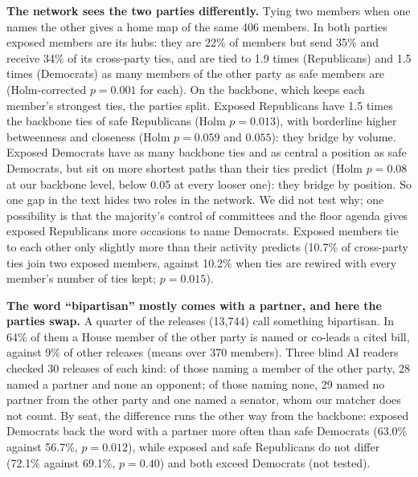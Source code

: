 \textbf{The network sees the two parties differently.} Tying two members when one names the other gives a home map of the same 406 members. In both parties exposed members are its hubs: they are 22\% of members but send 35\% and receive 34\% of its cross-party ties, and are tied to 1.9 times (Republicans) and 1.5 times (Democrats) as many members of the other party as safe members are (Holm-corrected $p = 0.001$ for each). On the backbone, which keeps each member's strongest ties, the parties split. Exposed Republicans have 1.5 times the backbone ties of safe Republicans (Holm $p = 0.013$), with borderline higher betweenness and closeness (Holm $p = 0.059$ and $0.055$): they bridge by volume. Exposed Democrats have as many backbone ties and as central a position as safe Democrats, but sit on more shortest paths than their ties predict (Holm $p = 0.08$ at our backbone level, below 0.05 at every looser one): they bridge by position. So one gap in the text hides two roles in the network. We did not test why; one possibility is that the majority's control of committees and the floor agenda gives exposed Republicans more occasions to name Democrats. Exposed members tie to each other only slightly more than their activity predicts (10.7\% of cross-party ties join two exposed members, against 10.2\% when ties are rewired with every member's number of ties kept; $p = 0.015$).

\textbf{The word ``bipartisan'' mostly comes with a partner, and here the parties swap.} A quarter of the releases (13,744) call something bipartisan. In 64\% of them a House member of the other party is named or co-leads a cited bill, against 9\% of other releases (means over 370 members). Three blind AI readers checked 30 releases of each kind: of those naming a member of the other party, 28 named a partner and none an opponent; of those naming none, 29 named no partner from the other party and one named a senator, whom our matcher does not count. By seat, the difference runs the other way from the backbone: exposed Democrats back the word with a partner more often than safe Democrats (63.0\% against 56.7\%, $p = 0.012$), while exposed and safe Republicans do not differ (72.1\% against 69.1\%, $p = 0.40$) and both exceed Democrats (not tested).
